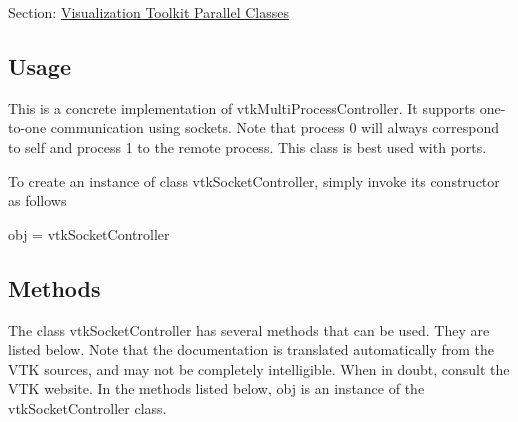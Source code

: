 Section\-: \hyperlink{sec_vtkparallel}{Visualization Toolkit Parallel Classes} \hypertarget{vtkwidgets_vtkxyplotwidget_Usage}{}\subsection{Usage}\label{vtkwidgets_vtkxyplotwidget_Usage}
This is a concrete implementation of vtk\-Multi\-Process\-Controller. It supports one-\/to-\/one communication using sockets. Note that process 0 will always correspond to self and process 1 to the remote process. This class is best used with ports.

To create an instance of class vtk\-Socket\-Controller, simply invoke its constructor as follows \begin{DoxyVerb}  obj = vtkSocketController
\end{DoxyVerb}
 \hypertarget{vtkwidgets_vtkxyplotwidget_Methods}{}\subsection{Methods}\label{vtkwidgets_vtkxyplotwidget_Methods}
The class vtk\-Socket\-Controller has several methods that can be used. They are listed below. Note that the documentation is translated automatically from the V\-T\-K sources, and may not be completely intelligible. When in doubt, consult the V\-T\-K website. In the methods listed below, {\ttfamily obj} is an instance of the vtk\-Socket\-Controller class. 
